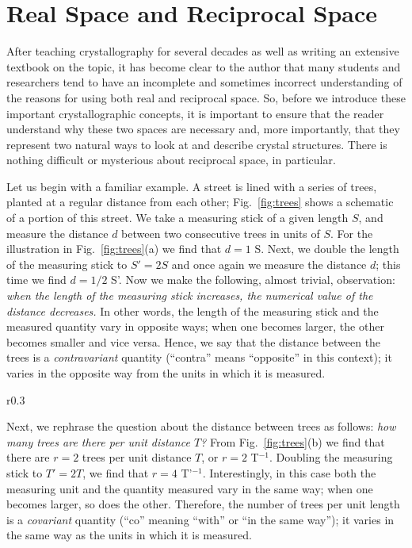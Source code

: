 \section{Real Space and Reciprocal Space\label{ssec:spaces}}
After teaching crystallography for several decades as well as writing an extensive textbook on the topic, it has become clear to the author that many students and researchers tend to have an incomplete and sometimes incorrect understanding of the reasons for using both real and reciprocal space.  So, before we introduce these important crystallographic concepts, it is important to ensure that the reader understand why these two spaces are necessary and, more importantly, that they represent two natural ways to look at and describe crystal structures.  There is nothing difficult or mysterious about reciprocal space, in particular.

Let us begin with a familiar example.  A street is lined with a series of trees, planted at a regular distance from each other;  Fig.~\ref{fig:trees} shows a schematic of a portion of this street.  We take a measuring stick of a given length $S$, and measure the distance $d$ between two consecutive trees in units of $S$.  For the illustration in Fig.~\ref{fig:trees}(a) we find that $d=1$ S.  Next, we double the length of the measuring stick to $S'=2S$ and once again we measure the distance $d$; this time we find $d = 1/2$ S'.  Now we make the following, almost trivial, observation: \textit{when the length of the measuring stick increases, the numerical value of the distance decreases.} In other words, the length of the measuring stick and the measured quantity vary in opposite ways; when one becomes larger, the other becomes smaller and vice versa.  Hence, we say that the distance between the trees is a \textit{contravariant} quantity (``contra'' means ``opposite'' in this context); it varies in the opposite way from the units in which it is measured.

\begin{wrapfigure}{r}{0.3\textwidth}
  \centering\leavevmode
\caption{\small Illustration of the measurement of (a) the distance between trees (a contravariant quantity) and (b) the number of trees per unit distance (a covariant quantity).\label{fig:trees}}
\end{wrapfigure}

Next, we rephrase the question about the distance between trees as follows: \textit{how many trees are there per unit distance $T$?}  From Fig.~\ref{fig:trees}(b) we find that there are $r=2$ trees per unit distance $T$, or $r=2$ T$^{-1}$.  Doubling the measuring stick to $T'=2T$, we find that $r=4$ T'$^{-1}$.  Interestingly, in this case both the measuring unit and the quantity measured vary in the same way; when one becomes larger, so does the other.  Therefore, the number of trees per unit length is a \textit{covariant} quantity (``co'' meaning ``with'' or ``in the same way''); it varies in the same way as the units in which it is measured.

